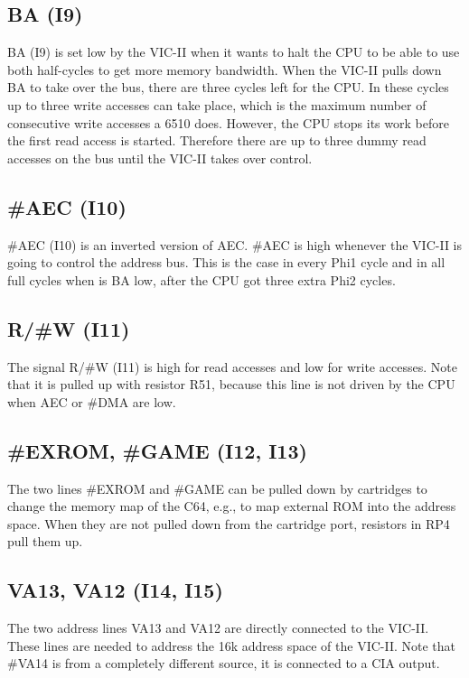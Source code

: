 \subsection{BA (I9)}

BA (I9) is set low by the VIC-II when it wants to halt the CPU to be able to
use both half-cycles to get more memory bandwidth. When the VIC-II pulls
down BA to take over the bus, there are three cycles left for the CPU. In
these cycles up to three write accesses can take place, which is the maximum
number of consecutive write accesses a 6510 does. However, the CPU stops its
work before the first read access is started.
Therefore there are up to three dummy read accesses on the bus until the
VIC-II takes over control.

\subsection{\#AEC (I10)}

\#AEC (I10) is an inverted version of AEC. \#AEC is high whenever the VIC-II
is going to control the address bus. This is the case in every Phi1 cycle
and in all full cycles when is BA low, after the CPU got three extra Phi2
cycles.

\subsection{R/\#W (I11)}

The signal R/\#W (I11) is high for read accesses and low for write accesses.
Note that it is pulled up with resistor R51, because this line is not driven
by the CPU when AEC or \#DMA are low.

\subsection{\#EXROM, \#GAME (I12, I13)}

The two lines \#EXROM and \#GAME can be pulled down by cartridges to change
the memory map of the C64, e.g., to map external ROM into the address space.
When they are not pulled down from the cartridge port, resistors in RP4 pull
them up.

\subsection{VA13, VA12 (I14, I15)}

The two address lines VA13 and VA12 are directly connected to the VIC-II.
These lines are needed to address the 16k address space of the VIC-II. Note
that \#VA14 is from a completely different source, it is connected to a CIA
output.

